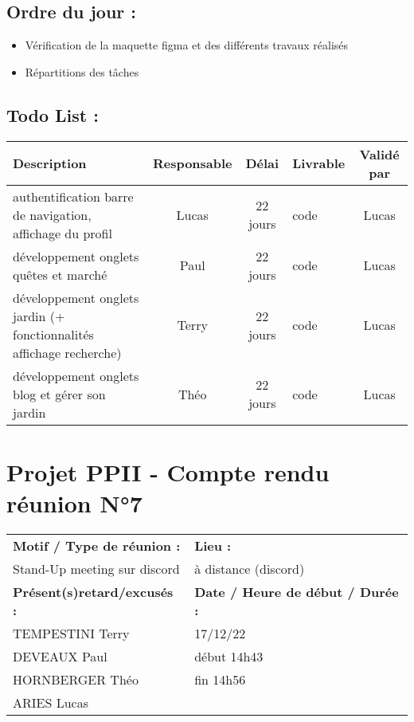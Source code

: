 \documentclass[12pt,titlepage]{report}
\begin{document}
\subsection*{Ordre du jour :}
\begin{itemize}
    \item{Vérification de la maquette figma et des différents travaux réalisés}
    \item{Répartitions des tâches}
\end{itemize}

\subsection*{Todo List :}
\begin{tabular}{|p{3.5cm}|c|c|p{4.5cm}|c|}
    \hline 
    Description & Responsable & Délai & Livrable & Validé par 
    \\ \hline
    authentification barre de navigation, affichage du profil & Lucas & 22 jours & code & Lucas
    \\ \hline
        développement onglets quêtes et marché & Paul & 22 jours & code & Lucas
    \\ \hline
        développement onglets jardin (+ fonctionnalités affichage recherche) & Terry & 22 jours & code & Lucas
    \\ \hline
        développement onglets blog et gérer son jardin  & Théo  & 22 jours & code & Lucas
    \\ \hline
\end{tabular}
\newpage

\section*{Projet PPII - Compte rendu réunion N°7}
\begin{tabular}{|p{7cm}|p{6cm}|}
    \hline
    \textbf{Motif / Type de réunion :}
    & \textbf{Lieu :}
    \\
    Stand-Up meeting sur discord
    & 
    à distance (discord)
    \\ \hline
    \textbf{Présent(s)retard/excusés :}
    &
    \textbf{Date / Heure de début / Durée :}
    \\ 
    TEMPESTINI Terry &  17/12/22\\  
    DEVEAUX Paul & début 14h43\\
    HORNBERGER Théo & fin 14h56\\
    ARIES Lucas & 
    \\ \hline
\end{tabular}
\end{document}
